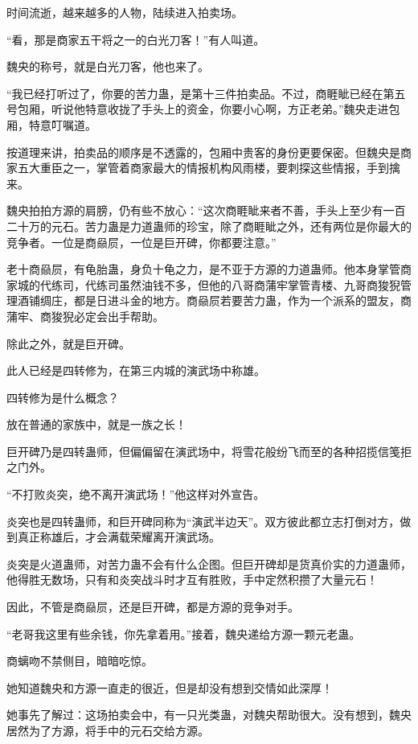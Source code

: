 
\begin{this_body}

时间流逝，越来越多的人物，陆续进入拍卖场。

“看，那是商家五干将之一的白光刀客！”有人叫道。

魏央的称号，就是白光刀客，他也来了。

“我已经打听过了，你要的苦力蛊，是第十三件拍卖品。不过，商睚眦已经在第五号包厢，听说他特意收拢了手头上的资金，你要小心啊，方正老弟。”魏央走进包厢，特意叮嘱道。

按道理来讲，拍卖品的顺序是不透露的，包厢中贵客的身份更要保密。但魏央是商家五大重臣之一，掌管着商家最大的情报机构风雨楼，要刺探这些情报，手到擒来。

魏央拍拍方源的肩膀，仍有些不放心：“这次商睚眦来者不善，手头上至少有一百二十万的元石。苦力蛊是力道蛊师的珍宝，除了商睚眦之外，还有两位是你最大的竞争者。一位是商赑屃，一位是巨开碑，你都要注意。”

老十商赑屃，有龟胎蛊，身负十龟之力，是不亚于方源的力道蛊师。他本身掌管商家城的代练司，代练司虽然油钱不多，但他的八哥商蒲牢掌管青楼、九哥商狻猊管理酒铺绸庄，都是日进斗金的地方。商赑屃若要苦力蛊，作为一个派系的盟友，商蒲牢、商狻猊必定会出手帮助。

除此之外，就是巨开碑。

此人已经是四转修为，在第三内城的演武场中称雄。

四转修为是什么概念？

放在普通的家族中，就是一族之长！

巨开碑乃是四转蛊师，但偏偏留在演武场中，将雪花般纷飞而至的各种招揽信笺拒之门外。

“不打败炎突，绝不离开演武场！”他这样对外宣告。

炎突也是四转蛊师，和巨开碑同称为“演武半边天”。双方彼此都立志打倒对方，做到真正称雄后，才会满载荣耀离开演武场。

炎突是火道蛊师，对苦力蛊不会有什么企图。但巨开碑却是货真价实的力道蛊师，他得胜无数场，只有和炎突战斗时才互有胜败，手中定然积攒了大量元石！

因此，不管是商赑屃，还是巨开碑，都是方源的竞争对手。

“老哥我这里有些余钱，你先拿着用。”接着，魏央递给方源一颗元老蛊。

商螭吻不禁侧目，暗暗吃惊。

她知道魏央和方源一直走的很近，但是却没有想到交情如此深厚！

她事先了解过：这场拍卖会中，有一只光类蛊，对魏央帮助很大。没有想到，魏央居然为了方源，将手中的元石交给方源。


\end{this_body}

